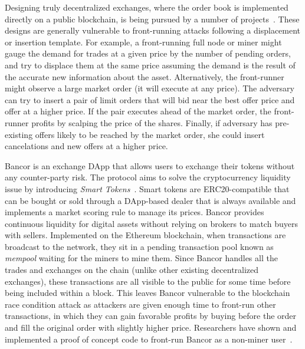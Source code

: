 Designing truly decentralized exchanges, where the order book is implemented directly on a public blockchain, is being pursued by a number of projects~\cite{inDEXgithub}. These designs are generally vulnerable to front-running attacks following a displacement or insertion template. For example, a front-running full node or miner might gauge the demand for trades at a given price by the number of pending orders, and try to displace them at the same price assuming the demand is the result of the accurate new information about the asset. Alternatively,  the front-runner might observe a large market order (\ie it will execute at any price). The adversary can try to insert a pair of limit orders that will bid near the best offer price and offer at a higher price. If the pair executes ahead of the market order, the front-runner profits by scalping the price of the shares. Finally, if adversary has pre-existing offers likely to be reached by the market order, she could insert cancelations and new offers at a higher price.





Bancor is an exchange DApp that allows users to exchange their tokens without any counter-party risk. The protocol aims to solve the cryptocurrency liquidity issue by introducing \textit{Smart Tokens}~\cite{hertzog2017bancor}. Smart tokens are ERC20-compatible that can be bought or sold through a DApp-based dealer that is always available and implements a market scoring rule to manage its prices. Bancor provides continuous liquidity for digital assets without relying on brokers to match buyers with sellers. Implemented on the Ethereum blockchain, when transactions are broadcast to the network, they sit in a pending transaction pool known as \textit{mempool} waiting for the miners to mine them. Since Bancor handles all the trades and exchanges on the chain (unlike other existing decentralized exchanges), these transactions are all visible to the public for some time before being included within a block. This leaves Bancor vulnerable to the blockchain race condition attack as attackers are given enough time to front-run other transactions, in which they can gain favorable profits by buying before the order and fill the original order with slightly higher price. Researchers have shown and implemented a proof of concept code to front-run Bancor as a non-miner user~\cite{NewTab13:online}.

